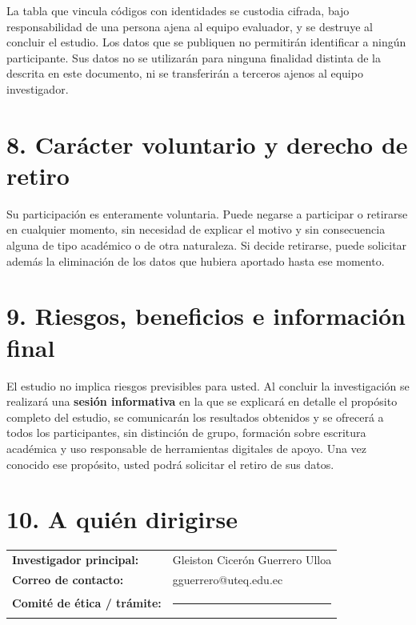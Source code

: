 \documentclass[12pt,a4paper,openany]{report}
\begin{document}
    La tabla que vincula c\'odigos con identidades se custodia cifrada, bajo responsabilidad de una persona ajena al equipo evaluador, y se destruye al concluir el estudio. Los datos que se publiquen no permitir\'an identificar a ning\'un participante. Sus datos no se utilizar\'an para ninguna finalidad distinta de la descrita en este documento, ni se transferir\'an a terceros ajenos al equipo investigador.
    
    \section*{8. Car\'acter voluntario y derecho de retiro}
    
    Su participaci\'on es enteramente voluntaria. Puede negarse a participar o retirarse en cualquier momento, sin necesidad de explicar el motivo y sin consecuencia alguna de tipo acad\'emico o de otra naturaleza. Si decide retirarse, puede solicitar adem\'as la eliminaci\'on de los datos que hubiera aportado hasta ese momento.
    
    \section*{9. Riesgos, beneficios e informaci\'on final}
    
    El estudio no implica riesgos previsibles para usted. Al concluir la investigaci\'on se realizar\'a una \textbf{sesi\'on informativa} en la que se explicar\'a en detalle el prop\'osito completo del estudio, se comunicar\'an los resultados obtenidos y se ofrecer\'a a todos los participantes, sin distinci\'on de grupo, formaci\'on sobre escritura acad\'emica y uso responsable de herramientas digitales de apoyo. Una vez conocido ese prop\'osito, usted podr\'a solicitar el retiro de sus datos.
    
    \section*{10. A qui\'en dirigirse}
    
    \begin{tabular}{@{}L{4.8cm}@{}L{9.0cm}@{}}
        \textbf{\small Investigador principal:} & Gleiston Cicerón Guerrero Ulloa \\
        \textbf{\small Correo de contacto:} & gguerrero@uteq.edu.ec \\
        \textbf{\small Comit\'e de \'etica / tr\'amite:} & \rule{8.8cm}{0.4pt} \\
    \end{tabular}
    
\end{document}
